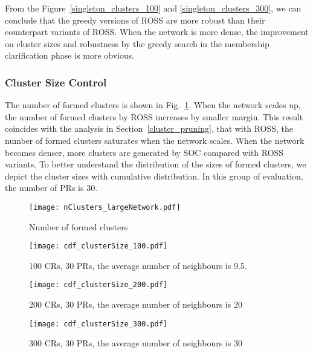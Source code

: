 From the Figure~\ref{singleton_clusters_100} and \ref{singleton_clusters_300}, we can conclude that the greedy versions of ROSS are more robust than their counterpart variants of ROSS.
When the network is more dense, the improvement on cluster sizes and robustness by the greedy search in the membership clarification phase is more obvious.


\subsubsection*{Cluster Size Control}

The number of formed clusters is shown in Fig.~\ref{nClusters_largeNetwork}.
When the network scales up, the number of formed clusters by ROSS increases by smaller margin.
This result coincides with the analysis in Section~\ref{cluster_pruning}, that with ROSS, the number of formed clusters saturates when the network scales.
When the network becomes denser, more clusters are generated by SOC compared with ROSS variants.
To better understand the distribution of the sizes of formed clusters, we depict the cluster sizes with cumulative distribution.
In this group of evaluation, the number of PRs is 30.

\begin{figure}[h!]
  \centering
   \texttt{[image: nClusters\_largeNetwork.pdf]}
  \caption{Number of formed clusters}
  \label{nClusters_largeNetwork}
\end{figure}



\begin{figure}[h!]
  \centering
   \texttt{[image: cdf\_clusterSize\_100.pdf]}
  \caption{100 CRs, 30 PRs, the average number of neighbours is 9.5.}
  \label{cdf_clusterSize_100}
\end{figure}

\begin{figure}[h!]
  \centering
   \texttt{[image: cdf\_clusterSize\_200.pdf]}
  \caption{200 CRs, 30 PRs, the average number of neighbours is 20}
  \label{cdf_clusterSize_200}
\end{figure}


\begin{figure}[h!]
  \centering
   \texttt{[image: cdf\_clusterSize\_300.pdf]}
  \caption{300 CRs, 30 PRs, the average number of neighbours is 30}
  \label{cdf_clusterSize_300}
\end{figure}

